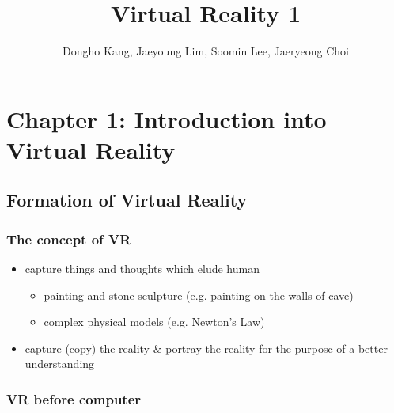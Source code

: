 \documentclass[12pt]{article}
\title{Virtual Reality 1}
\author{Dongho Kang, Jaeyoung Lim, Soomin Lee, Jaeryeong Choi}
\begin{document}
 

\maketitle

\section{Chapter 1: Introduction into Virtual Reality}

\subsection{Formation of Virtual Reality}

\subsubsection*{The concept of VR}

\begin{itemize}
	\item capture things and thoughts which elude human 
	\begin{itemize}
		\item painting and stone sculpture (e.g. painting on the walls of cave) 
 		\item complex physical models (e.g. Newton's Law)
	\end{itemize} 
	\item capture (copy) the reality \& portray the reality for the purpose of a better understanding
\end{itemize}

\subsubsection*{VR before computer}
\end{document}
